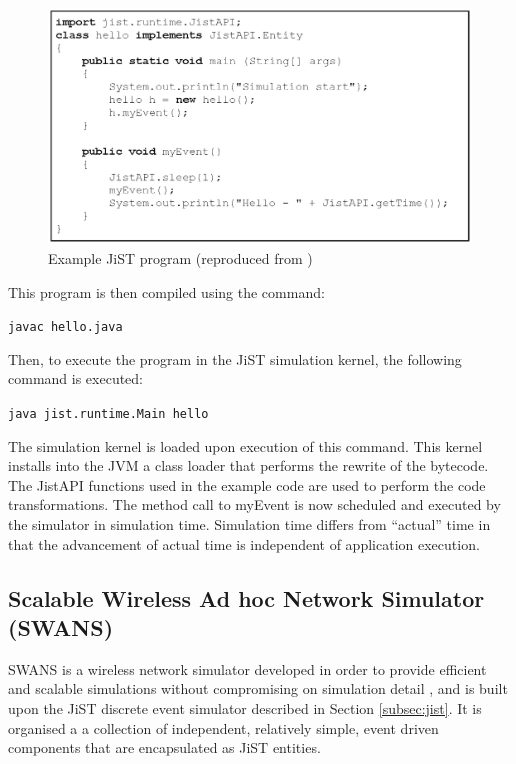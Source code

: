 \begin{figure} 
\centering
\label{Fig:JiSTcodeexample}
\includegraphics[scale=0.72]{img/JISTcodeexample.eps} \caption[Example JiST program]
{Example JiST program (reproduced from \cite{barr_JIST:2005})}
\end{figure}   
 
This program is then compiled using the command:
 
\begin{center}
\tt{javac hello.java}
\end{center}

Then, to execute the program in the JiST simulation kernel, the following
command is executed:

\begin{center}
\tt{java jist.runtime.Main hello}
\end{center}

The simulation kernel is loaded upon execution of this command. This kernel
installs into the JVM a class loader that performs the rewrite of the bytecode.
The JistAPI functions used in the example code are used to perform the
code transformations. The method call to myEvent is now scheduled and executed
by the simulator in simulation time. Simulation time differs from ``actual''
time in that the advancement of actual time is independent of application
execution. 
 
\subsection{Scalable Wireless Ad hoc Network Simulator (SWANS)}
SWANS is a wireless network simulator developed in order to provide efficient
and scalable simulations without compromising on simulation detail \cite{barr_SWANS},
and is built upon the JiST discrete event simulator described in Section \ref{subsec:jist}. 
It is organised a a collection of independent, relatively simple, event driven
components that are encapsulated as JiST entities. 
  
